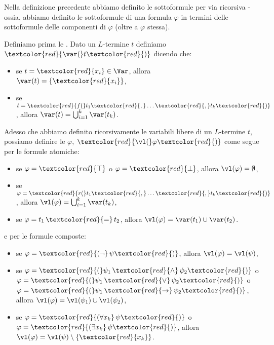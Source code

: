 Nella definizione precedente abbiamo definito le sottoformule per via ricorsiva - ossia, abbiamo definito le sottoformule di una formula $\varphi$ in termini delle sottoformule delle componenti di $\varphi$ (oltre a $\varphi$ stessa).

\begin{definition}
    Definiamo prima le . Dato un $L$-termine $t$ definiamo $\textcolor{red}{\var(} t \textcolor{red}{)}$ dicendo che:
    \begin{itemize}
        \item se $t = \textcolor{red}{x_i} \in \Var$, allora $\var(t) = \{\textcolor{red}{x_i}\}$,
        \item se $t = \textcolor{red}{f(}t_1\textcolor{red}{,} \ldots\textcolor{red}{,} t_k\textcolor{red}{)}$, allora $\var(t) = \bigcup_{i = 1}^k \var(t_k)$.
    \end{itemize}
    Adesso che abbiamo definito ricorsivamente le variabili libere di un $L$-termine $t$, possiamo definire le  $\varphi$, $\textcolor{red}{\vl(} \varphi \textcolor{red}{)}$ come segue per le formule atomiche:
    \begin{itemize}
        \item se $\varphi = \textcolor{red}{\top}$ o $\varphi = \textcolor{red}{\bot}$, allora $\vl(\varphi) = \emptyset$,
        \item se $\varphi = \textcolor{red}{r(} t_1\textcolor{red}{,} \ldots\textcolor{red}{,} t_k\textcolor{red}{)}$, allora $\vl(\varphi) = \bigcup_{i = 1}^k \var(t_k)$,
        \item se $\varphi = t_1\, \textcolor{red}{=}\, t_2$, allora $\vl(\varphi) = \var(t_1) \cup \var(t_2)$.
    \end{itemize}
    e per le formule composte:
    \begin{itemize}
        \item se $\varphi = \textcolor{red}{(\neg}\, \psi \textcolor{red}{)}$, allora $\vl(\varphi) = \vl(\psi)$,
        \item se $\varphi = \textcolor{red}{(} \psi_1 \,\textcolor{red}{\land} \,\psi_2 \textcolor{red}{)}$ o $\varphi = \textcolor{red}{(} \psi_1\, \textcolor{red}{\lor}\, \psi_2 \textcolor{red}{)}$ o $\varphi = \textcolor{red}{(} \psi_1\, \textcolor{red}{\to} \,\psi_2 \textcolor{red}{)}$, allora $\vl(\varphi) = \vl(\psi_1) \cup \vl(\psi_2)$,
        \item se $\varphi = \textcolor{red}{(\forall x_k} \,\psi \textcolor{red}{)}$ o $\varphi = \textcolor{red}{(\exists x_k}\, \psi \textcolor{red}{)}$, allora $\vl(\varphi) = \vl(\psi) \setminus \{\textcolor{red}{x_k}\}$.
    \end{itemize}
\end{definition}

